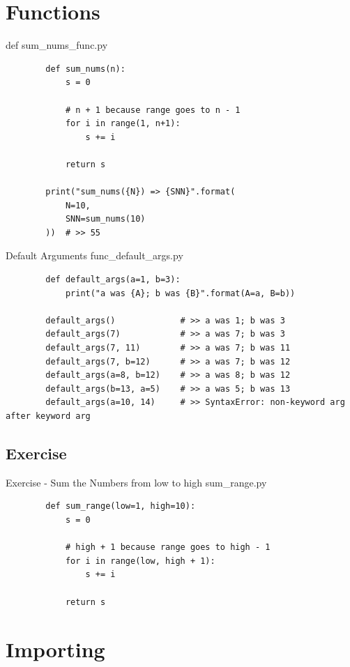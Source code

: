 \documentclass[11pt]{beamer}
\begin{document}
\section{Functions}
\begin{frame}[fragile]{def}
	sum\_nums\_func.py
	\begin{lstlisting}
		def sum_nums(n):
		    s = 0

		    # n + 1 because range goes to n - 1
		    for i in range(1, n+1):
		        s += i

		    return s

		print("sum_nums({N}) => {SNN}".format(
		    N=10,
		    SNN=sum_nums(10)
		))  # >> 55
	\end{lstlisting}
\end{frame}

\begin{frame}[fragile]{Default Arguments}
	func\_default\_args.py
	\begin{lstlisting}
		def default_args(a=1, b=3):
		    print("a was {A}; b was {B}".format(A=a, B=b))

		default_args()             # >> a was 1; b was 3
		default_args(7)            # >> a was 7; b was 3
		default_args(7, 11)        # >> a was 7; b was 11
		default_args(7, b=12)      # >> a was 7; b was 12
		default_args(a=8, b=12)    # >> a was 8; b was 12
		default_args(b=13, a=5)    # >> a was 5; b was 13
		default_args(a=10, 14)     # >> SyntaxError: non-keyword arg after keyword arg
	\end{lstlisting}
\end{frame}

\subsection{Exercise}
\begin{frame}[fragile]{Exercise - Sum the Numbers from low to high}
	sum\_range.py
	\pause
	\begin{lstlisting}
		def sum_range(low=1, high=10):
		    s = 0

		    # high + 1 because range goes to high - 1
		    for i in range(low, high + 1):
		        s += i

		    return s
	\end{lstlisting}
\end{frame}

\section{Importing}
\end{document}

